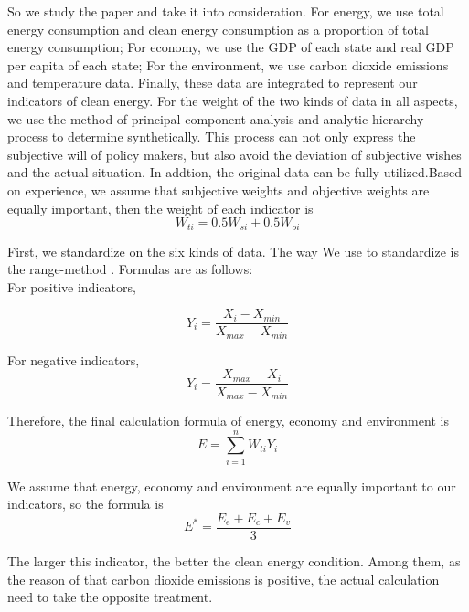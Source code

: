 \documentclass{mcmthesis}
\begin{document}
So we study the paper \cite{} and take it into consideration. For energy, we use total energy consumption and clean energy consumption as a proportion of total energy consumption; For economy, we use the GDP of each state and real GDP per capita of each state; For the environment, we use carbon dioxide emissions and temperature data. Finally, these data are integrated to represent our indicators of clean energy.
For the weight of the two kinds of data in all aspects, we use the method of principal component analysis and analytic hierarchy process to determine synthetically. This process can not only express the subjective will of policy makers, but also avoid the deviation of subjective wishes and the actual situation. In addtion, the original data can be fully utilized.Based on experience, we assume that subjective weights and objective weights are equally important, then the weight of each  indicator is
\begin{equation}
  W_{ti} = 0.5 W_{si} + 0.5 W_{oi} 
\end{equation}

First, we standardize on the six kinds of data. The way We use to standardize is the range-method . Formulas are as follows:\\

For positive indicators,

\begin{equation}
  Y_i = \frac{X_i - X_{min}}{X_{max} - X_{min}}
\end{equation}

For negative indicators,
\begin{equation}
  Y_i = \frac{X_{max} - X_i}{X_{max} - X_{min}}
\end{equation}

Therefore, the final calculation formula of energy, economy and environment is 
\begin{equation}
  E = \sum_{i=1}^{n} W_{ti} Y_{i} 
\end{equation}

We assume that energy, economy and environment are equally important to our indicators, so the formula is
\begin{equation}
  E^{*} = \frac{E_e + E_c + E_v}{3}
\end{equation}

The larger this indicator, the better the clean energy condition. Among them, as the reason of that carbon dioxide emissions is positive, the actual calculation need to take the opposite treatment.
\end{document}
